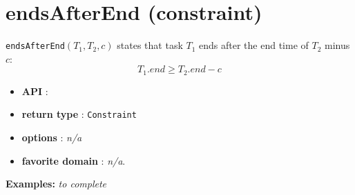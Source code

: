 \section{endsAfterEnd (constraint)}\label{endsafterend:endsafterendconstraint}\hypertarget{endsafterend:endsafterendconstraint}{}
\begin{notedef}
\texttt{endsAfterEnd}$(T_1,T_2,c)$  states that task $T_1$ ends after the end time of $T_2$ minus $c$:
  $$T_{1}.end \ge T_{2}.end - c$$
\end{notedef}

\begin{itemize}
	\item \textbf{API} :
	\item \textbf{return type} : \texttt{Constraint}
	\item \textbf{options} : \emph{n/a}
	\item \textbf{favorite domain} : \emph{n/a}.
\end{itemize}

\textbf{Examples:}
%
\emph{to complete}
